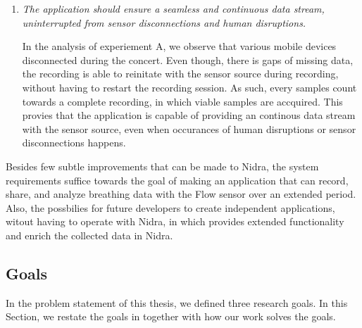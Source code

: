 \begin{enumerate}
    \item \textit{The application should ensure a seamless and continuous data stream, uninterrupted from sensor disconnections and human disruptions.}
    
    In the analysis of experiement A, we observe that various mobile devices disconnected during the concert. Even though, there is gaps of missing data, the recording is able to reinitate with the sensor source during recording, without having to restart the recording session. As such, every samples count towards a complete recording, in which viable samples are accquired. This provies that the application is capable of providing an continous data stream with the sensor source, even when occurances of human disruptions or sensor disconnections happens. 
    
\end{enumerate}

Besides few subtle improvements that can be made to Nidra, the system requirements suffice towards the goal of making an application that can record, share, and analyze breathing data with the Flow sensor over an extended period. Also, the possbilies for future developers to create independent applications, witout having to operate with Nidra, in which provides extended functionality and enrich the collected data in Nidra. 

\subsection{Goals}

In the problem statement of this thesis, we defined three research goals. In this Section, we restate the goals in together with how our work solves the goals. 

